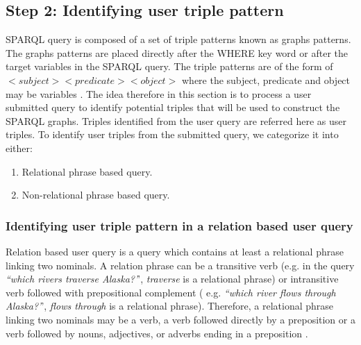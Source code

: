 \documentclass[review]{elsarticle}
\begin{document}
\subsection{Step 2: Identifying user triple pattern}
SPARQL query is composed of a set of triple patterns known as graphs patterns. The graphs patterns  are placed directly after the WHERE key word or after the target variables in the SPARQL query. The triple patterns are of the form of $<subject> <predicate> <object>$ where the subject, predicate and object may be variables \citep{Sparql12}.  The idea therefore in this section is to process a user submitted query to identify potential triples that will be used to construct the SPARQL graphs. Triples identified from the user query are referred here as user triples. To identify user triples from the submitted query,  we categorize it into either:
\begin{enumerate}
\item Relational phrase based query.
\item Non-relational phrase based query.
\end{enumerate}

\subsubsection{ Identifying user  triple pattern in a relation based user query}
Relation based user query  is a query  which contains at least a relational phrase linking two nominals.  A relation phrase  can be a transitive verb (e.g. in the query  \textit{``which rivers traverse Alaska?'}', \textit{traverse} is a relational phrase) or intransitive verb followed with  prepositional complement ( e.g.  \textit{``which river flows through Alaska?'}', \textit{flows through} is a relational phrase). Therefore, a relational phrase linking two nominals may be a verb, a verb followed directly by a preposition  or a verb followed
by nouns, adjectives, or adverbs ending in a preposition  \citep{reverb12}.  
\end{document}
